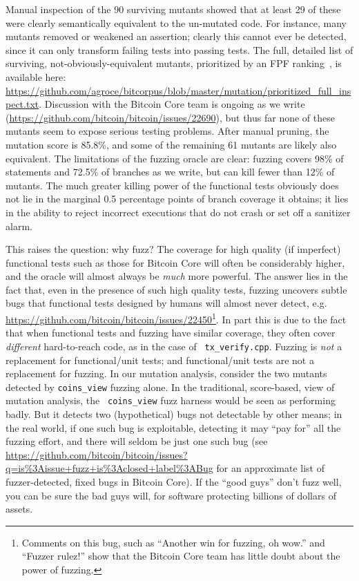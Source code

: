 Manual inspection of the 90 surviving mutants showed that at
least 29 of these were clearly semantically equivalent to the
un-mutated code.  For instance, many mutants removed or weakened an
assertion; clearly this cannot ever be detected, since it can only
transform failing tests into passing tests.  The full, detailed list
of surviving, not-obviously-equivalent mutants, prioritized by an FPF ranking~\cite{10.1145/2491956.2462173,Gonzalez85}, is
available here:
\url{https://github.com/agroce/bitcorpus/blob/master/mutation/prioritized_full_inspect.txt}.
Discussion with the Bitcoin Core team is ongoing as we write
(\url{https://github.com/bitcoin/bitcoin/issues/22690}), but thus far
none of these mutants seem to expose serious testing
problems.  After manual pruning, the mutation score is 85.8\%, and
some of the remaining 61 mutants are likely also equivalent.  The
limitations of the fuzzing oracle are clear: fuzzing covers 98\% of
statements and 72.5\% of branches as we write, but can kill fewer than
12\% of mutants.  The much greater killing power of the functional
tests obviously does not lie in the marginal 0.5
percentage points of  branch coverage it obtains; it lies
in the ability to reject incorrect executions that do not crash or set
off a sanitizer alarm.

This raises the question:  why fuzz?  The coverage for high quality
(if imperfect) functional tests such as those for Bitcoin Core will
often be considerably
higher, and the oracle will almost always be \emph{much} more powerful.  The answer lies in the
fact that, even in the presence of such high quality tests, fuzzing
uncovers subtle bugs that functional tests designed by humans will
almost never detect,
e.g. \url{https://github.com/bitcoin/bitcoin/issues/22450}\footnote{Comments
  on this bug, such as ``Another win for fuzzing, oh wow.'' and
  ``Fuzzer rulez!'' show that the Bitcoin Core team has little doubt
  about the power of fuzzing.}.  In part this is due to the fact that
when functional tests and fuzzing have similar coverage, they often
cover \emph{different} hard-to-reach code, as in the case of {\tt
  tx\_verify.cpp}.  Fuzzing is \emph{not} a replacement
for functional/unit tests; and functional/unit tests are not a
replacement for fuzzing.  In our mutation analysis, consider the two
mutants detected by {\tt coins\_view} fuzzing alone.  In the
traditional, score-based, view of mutation analysis, the {\tt
  coins\_view} fuzz harness would be seen as performing badly.  But it
detects two (hypothetical) bugs not detectable by other means; in the
real world, if one such bug is exploitable, detecting it may ``pay
for'' all the fuzzing effort, and there will seldom be just one such
bug (see
\url{https://github.com/bitcoin/bitcoin/issues?q=is\%3Aissue+fuzz+is\%3Aclosed+label\%3ABug}
for an approximate list of fuzzer-detected, fixed bugs in Bitcoin
Core).  If the ``good guys'' don't fuzz well, you can be sure the bad
guys will, for software protecting billions of dollars of assets.

